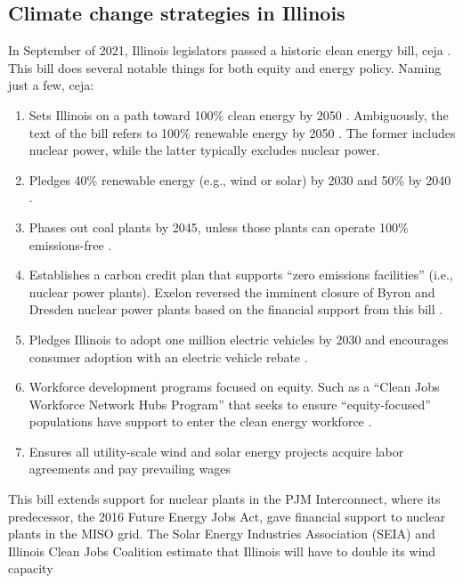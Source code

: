 \subsection{Climate change strategies in Illinois}
In September of 2021, Illinois legislators passed a historic clean energy bill,
\gls{ceja} \cite{harmon_climate_2021}. This bill does several notable things for
both equity and energy policy. Naming just a few, \gls{ceja}:
\begin{enumerate}
  \item Sets Illinois on a path toward 100\% clean energy by 2050
  \cite{office_of_governor_jb_pritzker_gov_2021}. Ambiguously,
  the text of the bill refers to 100\% renewable energy by 2050 \cite{harmon_climate_2021}.
  The former includes nuclear power, while the latter typically excludes nuclear power.
  \item Pledges 40\% renewable energy (e.g., wind or solar) by 2030 and 50\% by 2040
  \cite{office_of_governor_jb_pritzker_gov_2021}.
  \item Phases out coal plants by 2045, unless those plants can operate 100\% emissions-free
  \cite{office_of_governor_jb_pritzker_gov_2021}.
  \item Establishes a carbon credit plan that supports “zero emissions facilities”
  (i.e., nuclear power plants). Exelon reversed the imminent closure of Byron and
  Dresden nuclear power plants based on the financial support from this bill \cite{brown_two_2021}.
  \item Pledges Illinois to adopt one million electric vehicles by 2030 and
  encourages consumer adoption with an electric vehicle rebate
  \cite{office_of_governor_jb_pritzker_gov_2021}.
  \item Workforce development programs focused on equity. Such as a
  “Clean Jobs Workforce Network Hubs Program” that seeks to ensure “equity-focused”
  populations have support to enter the clean energy workforce \cite{office_of_governor_jb_pritzker_gov_2021}.
  \item Ensures all utility-scale wind and solar energy projects acquire labor
  agreements and pay prevailing wages \cite{office_of_governor_jb_pritzker_gov_2021}
\end{enumerate}
This bill extends support for nuclear plants in the PJM Interconnect, where its
predecessor, the 2016 Future Energy Jobs Act, gave financial support to nuclear
plants in the MISO grid. The Solar Energy Industries Association (SEIA) and Illinois
Clean Jobs Coalition estimate that Illinois will have to double its wind capacity
